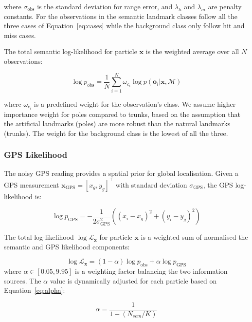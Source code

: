 \documentclass[letterpaper, 10 pt, conference]{ieeeconf}
\begin{document}
where $\sigma_{\text{obs}}$ is the standard deviation for range error, and $\lambda_h$ and $\lambda_m$ are penalty constants. For the observations in the semantic landmark classes follow all the three cases of Equation~\ref{eq:cases} while the background class only follow hit and miss cases.

The total semantic log-likelihood for particle $\mathbf{x}$ is the weighted average over all $N$ observations:

\begin{equation}
\log p_{\text{obs}} = \frac{1}{N} \sum_{i=1}^{N} \omega_{c_i} \log p(\mathbf{o}_i | \mathbf{x}, \mathcal{M})
\end{equation}

where $\omega_{c_i}$ is a predefined weight for the observation's class. We assume higher importance weight for poles compared to trunks, based on the assumption that the artificial landmarks (poles) are more robust than the natural landmarks (trunks). The weight for the background class is the lowest of all the three. 

\subsubsection{GPS Likelihood}
The noisy GPS reading provides a spatial prior for global localisation. Given a GPS measurement $\mathbf{x}_{\text{GPS}} = [x_g, y_g]^\top$ with standard deviation $\sigma_{\text{GPS}}$, the GPS log-likelihood is:

\begin{equation}
\log p_{\text{GPS}} = -\frac{1}{2\sigma_{\text{GPS}}^2} \left( (x_i - x_g)^2 + (y_i - y_g)^2 \right)
\end{equation}

The total log-likelihood $\log \mathcal{L}_\mathbf{x}$ for particle $\mathbf{x}$ is a weighted sum of normalised the semantic and GPS likelihood components:

\begin{equation}
\log \mathcal{L}_\mathbf{x} = (1-\alpha) \log p_{\text{obs}} + \alpha \log p_{\text{GPS}}
\label{eq:lx}
\end{equation}
%
where $\alpha \in [0.05, 9.95]$ is a weighting factor balancing the two information sources. The $\alpha$ value is dynamically adjusted for each particle based on Equation~\ref{eq:alpha}:

\begin{equation}
\alpha = \frac{1}{1 + (N_{sem}/K)}
\label{eq:alpha}
\end{equation}
\end{document}
